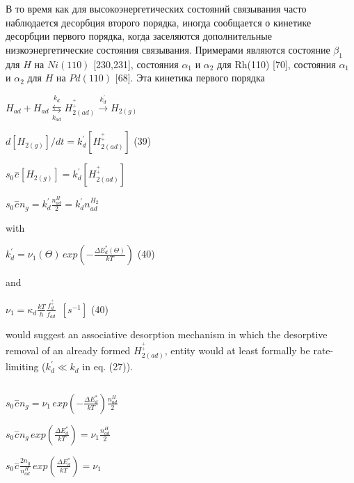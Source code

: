 \documentclass[11pt]{article}
\makeatletter
\newcommand{\boxspacing}{\kern\kvtcb@left@rule\kern\kvtcb@boxsep}
\newcommand{\prompt}[4]{
        {\ttfamily\llap{{\color{#2}[#3]:\hspace{3pt}#4}}\vspace{-\baselineskip}}
    }
\makeatother
\begin{document}
    В то время как для высокоэнергетических состояний связывания часто
наблюдается десорбция второго порядка, иногда сообщается о кинетике
десорбции первого порядка, когда заселяются дополнительные
низкоэнергетические состояния связывания. Примерами являются состояние
\(\beta_1\) для \(H\) на \(Ni(110)\) {[}230,231{]}, состояния
\(\alpha_1\) и \(\alpha_2\) для Rh(110) {[}70{]}, состояния \(\alpha_1\)
и \(\alpha_2\) для \(H\) на \(Pd(110)\) {[}68{]}. Эта кинетика первого
порядка

    \(H_{ad} + H_{ad} \underset{k_{ad}}{\overset{k_d}{\leftrightarrows}} H_{2(ad)}^{{}_{+}^{+}}\overset{k_d^{\prime}}{\rightarrow}H_{2(g)}\)

    \(d\left[ H_{2(g)} \right] \big / dt = k_d^{\prime} \left[ H_{2(ad)}^{{}_{+}^{+}} \right]\)
(39)

    \(s_0\overset{-}c\left[ H_{2(g)} \right] = k_d^{\prime} \left[ H_{2(ad)}^{{}_{+}^{+}} \right]\)

    \(s_0\overset{-}c n_g = k_d^{\prime} \frac{n_{ad}^{H}}{2} = k_d^{\prime} {n_{ad}^{H_2}}\)

    with

    \(k_d^{\prime} = \nu_1 \left(\Theta\right) \, exp \left(-\frac{\Delta E^{*}_{d}\left(\Theta\right)}{kT} \right)\)
(40)

    and

    \(\nu_1 = \kappa_d \frac{k T}{h} \frac{f_{d}^{{}_{+}^{+}}}{f_{ad}} \,\,\, [s^{-1}]\)
(40)

    would suggest an associative desorption mechanism in which the
desorptive removal of an already formed \(H_{2(ad)}^{{}_{+}^{+}}\),
entity would at least formally be rate-limiting
(\(k_{d}^{\prime} \ll k_d\) in eq. (27)).

    \begin{tcolorbox}[breakable, size=fbox, boxrule=1pt, pad at break*=1mm,colback=cellbackground, colframe=cellborder]
\prompt{In}{incolor}{ }{\boxspacing}
\begin{Verbatim}[commandchars=\\\{\}]

\end{Verbatim}
\end{tcolorbox}

    \(s_0\overset{-}c n_g = \nu_1 \, exp \left(-\frac{\Delta E^{*}_{d}}{kT} \right) \frac{n_{ad}^{H}}{2}\)

    \(s_0\overset{-}c n_g \, exp \left(\frac{\Delta E^{*}_{d}}{kT} \right) = \nu_1 \frac{n_{ad}^{H}}{2}\)

    \(s_0\overset{-}c \frac{2 n_g}{n_{ad}^{H}} \, exp \left(\frac{\Delta E^{*}_{d}}{kT} \right) = \nu_1\)
\end{document}
